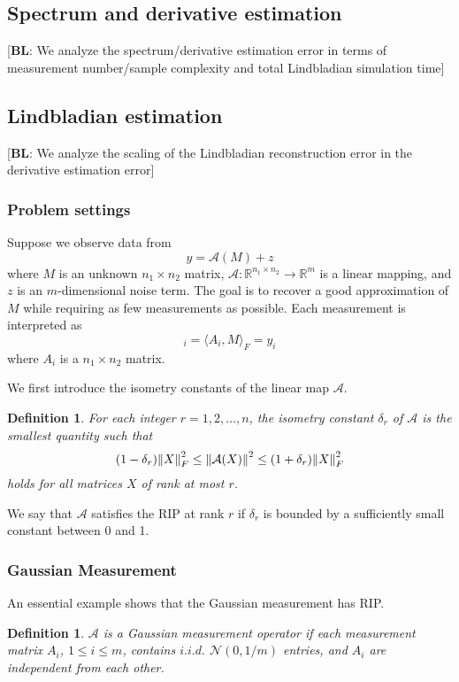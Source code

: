 \documentclass[10pt]{article}  %
\theoremstyle{plain}
\newtheorem{definition}[thm]{Definition}
\numberwithin{equation}{section}
\newcommand{\innerp}[1]{\langle{#1}\rangle}
\def\mN{\mathcal{N}}
\def\mA{\mathcal{A}}
\def\R{\mathbb{R}}
\newcommand{\bl}[1]{{\color{magenta} [\textbf{BL}: #1]}}
\renewcommand{\R}{\mathbb{R}}
\begin{document}
\subsection{Spectrum and derivative estimation}

\bl{We analyze the spectrum/derivative estimation error in terms of measurement number/sample complexity and total Lindbladian simulation time}

\subsection{Lindbladian estimation}

\bl{We analyze the scaling of the Lindbladian reconstruction error in the derivative estimation error}

\subsubsection{Problem settings}
Suppose we observe data from 
\begin{equation}
	y = \mA(M) + z
\end{equation}
where $M$ is an unknown $n_1 \times n_2$ matrix, $\mA : \R^{n_1\times n_2} \to \R^m$ is a linear mapping, and $z$ is an $m$-dimensional noise term. The goal is to recover a good approximation of $M$ while requiring as few measurements as possible. Each measurement is interpreted as 
\begin{equation}
	[\mA(M)]_i = \innerp{A_i, M}_F = y_i
\end{equation}
where $A_i$ is a $n_1\times n_2$ matrix.





We first introduce the isometry constants of the linear map $\mA$. 
\begin{definition}
	For each integer $r = 1, 2, \dots , n$, the isometry constant $\delta_r$ of $\mA$ is the smallest quantity such that 
	\begin{equation}
		(1 - \delta_r)\norm{X}_F^2 \leq \norm{\mA(X)}^2 \leq (1 + \delta_r) \norm{X}_F^2
	\end{equation}
	holds for all matrices $X$ of rank at most $r$. 
\end{definition}
We say that $\mA$ satisfies the RIP at rank $r$ if $\delta_r$ is bounded by a sufficiently small constant between 0 and 1. 



\subsubsection{Gaussian Measurement}
An essential example shows that the Gaussian measurement has RIP.
\begin{definition}
	$\mA$ is a Gaussian measurement operator if each measurement matrix $A_i$, $1 \leq i \leq m$, contains $i.i.d.$ $\mN(0, 1/m)$ entries, and $A_i$ are independent from each other. 
\end{definition}
\end{document}
